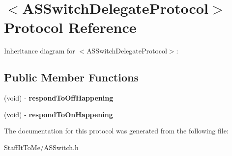 \hypertarget{protocol_a_s_switch_delegate_protocol-p}{
\section{$<$\-A\-S\-Switch\-Delegate\-Protocol$>$ \-Protocol \-Reference}
\label{protocol_a_s_switch_delegate_protocol-p}
}


\-Inheritance diagram for $<$\-A\-S\-Switch\-Delegate\-Protocol$>$\-:
\subsection*{\-Public \-Member \-Functions}
\begin{DoxyCompactItemize}
\item 
\hypertarget{protocol_a_s_switch_delegate_protocol-p_ae114c2f39adace869248e47f6d273b23}{
(void) -\/ {\bfseries respond\-To\-Off\-Happening}}
\label{protocol_a_s_switch_delegate_protocol-p_ae114c2f39adace869248e47f6d273b23}

\item 
\hypertarget{protocol_a_s_switch_delegate_protocol-p_acc07db00a33c3bc86a0504c7828fb599}{
(void) -\/ {\bfseries respond\-To\-On\-Happening}}
\label{protocol_a_s_switch_delegate_protocol-p_acc07db00a33c3bc86a0504c7828fb599}

\end{DoxyCompactItemize}


\-The documentation for this protocol was generated from the following file\-:\begin{DoxyCompactItemize}
\item 
\-Staff\-It\-To\-Me/\-A\-S\-Switch.\-h\end{DoxyCompactItemize}
